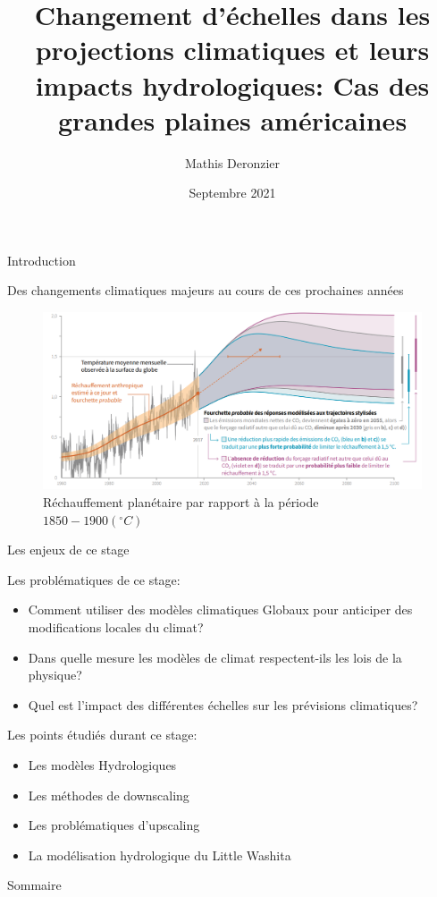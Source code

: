 \documentclass{beamer}
\title{Changement d’échelles dans les projections climatiques et leurs impacts hydrologiques: Cas des grandes plaines américaines}
\author{Mathis Deronzier}
\date{Septembre 2021}
\numberwithin{equation}{section}
\begin{document}
	\frame{\titlepage}
	
	\begin{frame}{Introduction}
		\begin{minipage}[b]{1\linewidth}{Des changements climatiques majeurs au cours de ces prochaines années}
			\begin{figure}
				\includegraphics[scale=0.25]{proj_GIEC.png}
				\caption{Réchauffement planétaire par rapport à la période $1850-1900 (^{\circ}C)$}
			\end{figure}
		\end{minipage}
	\end{frame}
	
	\begin{frame}{Les enjeux de ce stage}
		\begin{block}{Les problématiques de ce stage:}
			\begin{itemize}
				\item Comment utiliser des modèles climatiques Globaux pour anticiper des modifications locales du climat?
				\item Dans quelle mesure les modèles de climat respectent-ils les lois de la physique?
				\item Quel est l'impact des différentes échelles sur les prévisions climatiques?
			\end{itemize}
		\end{block}
		\begin{block}{Les points étudiés durant ce stage:}
			\begin{itemize}
				\item Les modèles Hydrologiques
				\item Les méthodes de downscaling
				\item Les problématiques d'upscaling
				\item La modélisation hydrologique du Little Washita
			\end{itemize}
		\end{block}
	\end{frame}
	\begin{frame}{Sommaire}
		\tableofcontents
	\end{frame}
\end{document}
